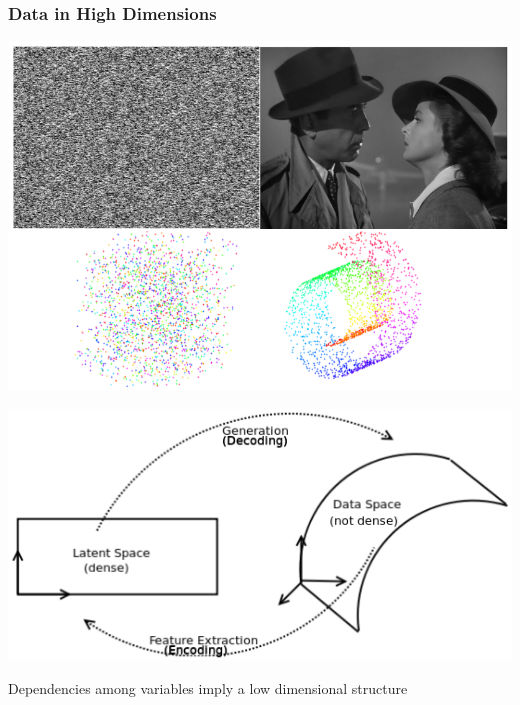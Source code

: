 \documentclass{beamer}
\begin{document}
\begin{frame}
\frametitle{Data in High Dimensions} 
\centerline{\includegraphics[scale=0.2]{./images/DQE/structure.png}}
\centerline{\includegraphics[scale=0.35]{./images/DQE/spaces.png}}
Dependencies among variables imply a low dimensional structure
\end{frame} 
\end{document}

